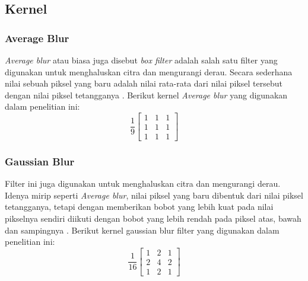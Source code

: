 

\subsection{Kernel}

\subsubsection{Average Blur}
\textit{Average blur} atau biasa juga disebut \textit{box filter} adalah salah satu filter yang digunakan untuk menghaluskan citra dan mengurangi derau. Secara sederhana nilai sebuah piksel yang baru adalah nilai rata-rata dari nilai piksel tersebut dengan nilai piksel tetangganya \cite{pdf:marcin}. Berikut kernel \textit{Average blur} yang digunakan dalam penelitian ini:
\begin{equation}
    \label{kernel:average}
    \frac{1}{9} \left[
    \begin{matrix}
 1 & 1 & 1 \\
 1 & 1 & 1 \\
 1 & 1 & 1
    \end{matrix}
    \right]
\end{equation}

\subsubsection{Gaussian Blur}
Filter ini juga digunakan untuk menghaluskan citra dan mengurangi derau. Idenya mirip seperti \textit{Average blur}, nilai piksel yang baru dibentuk dari nilai piksel tetangganya, tetapi dengan memberikan bobot yang lebih kuat pada nilai pikselnya sendiri diikuti dengan bobot yang lebih rendah pada piksel atas, bawah dan sampingnya \cite{soa:dmitry}. Berikut kernel gaussian blur filter yang digunakan dalam penelitian ini:
\begin{equation}
    \label{kernel:gaussianblur}
    \frac{1}{16}
    \left[
    \begin{matrix}
 1 & 2 & 1 \\
 2 & 4 & 2 \\
 1 & 2 & 1
    \end{matrix}
    \right]
\end{equation}


